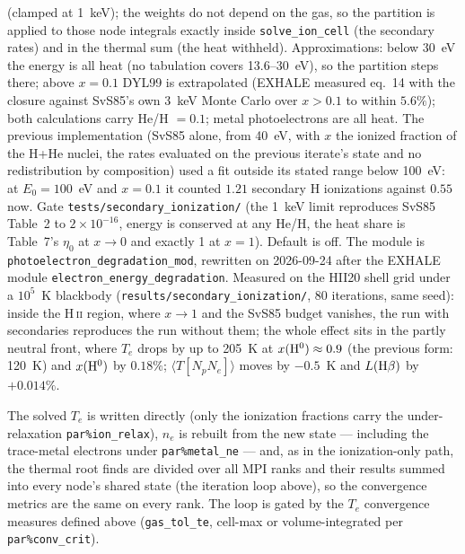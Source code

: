 \documentclass[english,a4paper]{my_memo}
\newcommand{\code}[1]{\texttt{#1}}
\begin{document}
(clamped at 1~keV); the weights do not depend on the gas, so the
partition is applied to those node integrals exactly inside
\code{solve\_ion\_cell} (the secondary rates) and in the thermal sum (the
heat withheld).  Approximations: below 30~eV the energy is all heat (no
tabulation covers 13.6--30~eV), so the partition steps there; above
$x = 0.1$ DYL99 is extrapolated (EXHALE measured eq.~14 with the closure
against SvS85's own 3~keV Monte Carlo over $x > 0.1$ to within $5.6\%$);
both calculations carry He/H $= 0.1$; metal photoelectrons are all heat.
The previous implementation (SvS85 alone, from 40~eV, with $x$ the ionized
fraction of the H+He nuclei, the rates evaluated on the previous
iterate's state and no redistribution by composition) used a fit outside
its stated range below 100~eV: at $E_0 = 100$~eV and $x = 0.1$ it counted
$1.21$ secondary H ionizations against $0.55$ now.  Gate
\code{tests/secondary\_ionization/} (the 1~keV limit reproduces SvS85
Table~2 to $2\times10^{-16}$, energy is conserved at any He/H, the heat
share is Table~7's $\eta_0$ at $x \to 0$ and exactly 1 at $x = 1$).
Default is off.  The module is \code{photoelectron\_degradation\_mod},
rewritten on 2026-09-24 after the EXHALE module
\code{electron\_energy\_degradation}.  Measured on the HII20 shell grid
under a $10^5$~K blackbody (\code{results/secondary\_ionization/}, 80
iterations, same seed): inside the H\,\textsc{ii} region, where $x \to 1$
and the SvS85 budget vanishes, the run with secondaries reproduces the run
without them; the whole effect sits in the partly neutral front, where
$T_e$ drops by up to 205~K at $x({\rm H^0}) \approx 0.9$ (the previous
form: 120~K) and $x({\rm H^0})$ by $0.18\%$; $\langle T[N_pN_e]\rangle$
moves by $-0.5$~K and $L({\rm H}\beta)$ by $+0.014\%$.

The solved $T_e$ is written directly (only the ionization fractions carry
the under-relaxation \code{par\%ion\_relax}), $n_e$ is rebuilt from the
new state --- including the trace-metal electrons under
\code{par\%metal\_ne} --- and, as in the ionization-only path, the
thermal root finds are divided over all MPI ranks and their results summed into
every node's shared state (the iteration loop above),
so the convergence metrics are the same on every rank.  The loop is gated by the $T_e$
convergence measures defined above (\code{gas\_tol\_te}, cell-max or
volume-integrated per \code{par\%conv\_crit}).
\end{document}
